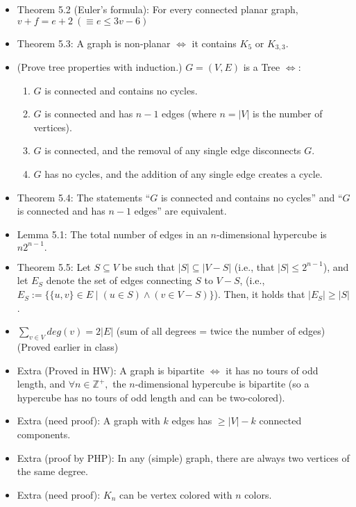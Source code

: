 \documentclass{article}
\begin{document}
\begin{itemize}
	\item Theorem 5.2 (Euler’s formula): For every connected planar graph, $v + f = e + 2\ (\equiv e\leq 3v - 6)$
	\item Theorem 5.3: A graph is non-planar $\iff$ it contains $K_5$ or $K_{3,3}$.
	\item (Prove tree properties with induction.) $G = (V, E)$ is a Tree $\iff$:
	\begin{enumerate}
		\item $G$ is connected and contains no cycles.
		\item $G$ is connected and has $n-1$ edges (where $n = |V|$ is the number of vertices).
		\item $G$ is connected, and the removal of any single edge disconnects $G$.
		\item $G$ has no cycles, and the addition of any single edge creates a cycle.
	\end{enumerate}
	\item Theorem 5.4: The statements ``$G$ is connected and contains no cycles'' and ``$G$ is connected and has $n-1$ edges'' are equivalent.
	\item Lemma 5.1: The total number of edges in an $n$-dimensional hypercube is $n2^{n-1}.$
	\item Theorem 5.5: Let $S\subseteq V$ be such that $|S|\subseteq|V-S|$ (i.e., that $|S|\leq2^{n-1}$), and let $E_S$ denote the set of edges connecting $S$ to $V-S$, (i.e., $E_S := \big\{\{u, v\}\in E \mid (u\in S) \land (v\in V-S) \big\}$). Then, it holds that $|E_S|\geq|S|$.
	\item $\sum\limits_{v\in V} deg(v) = 2|E|$ (sum of all degrees = twice the number of edges) (Proved earlier in class)
	\item Extra (Proved in HW): A graph is bipartite $\iff$ it has no tours of odd length, and $\forall n\in\mathbb{Z^+},$ the $n$-dimensional hypercube is bipartite (so a hypercube has no tours of odd length and can be two-colored).
	\item Extra (need proof): A graph with $k$ edges has $\geq|V| - k$ connected components.
	\item Extra (proof by PHP): In any (simple) graph, there are always two vertices of the same degree.
	\item Extra (need proof): $K_n$ can be vertex colored with $n$ colors.
\end{itemize}
\end{document}
